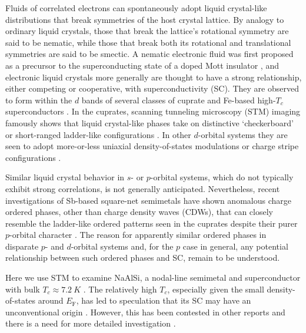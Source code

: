 \documentclass[reprint,superscriptaddress,prb,aps]{revtex4-2}
\begin{document}
\maketitle

Fluids of correlated electrons can spontaneously adopt liquid crystal-like distributions that break symmetries of the host crystal lattice. By analogy to ordinary liquid crystals, those that break the lattice's rotational symmetry are said to be nematic, while those that break both its rotational and translational symmetries are said to be smectic. A nematic electronic fluid was first proposed as a precursor to the superconducting state of a doped Mott insulator \cite{Kivelson1998}, and electronic liquid crystals more generally are thought to have a strong relationship, either competing or cooperative, with superconductivity (SC). They are observed to form within the $d$ bands of several classes of cuprate and Fe-based high-$T_{c}$ superconductors \cite{Tranquada1995,Lawler2010,Keimer2015,Shibauchi2020}. In the cuprates, scanning tunneling microscopy (STM) imaging famously shows that liquid crystal-like phases take on distinctive `checkerboard' or short-ranged ladder-like configurations \cite{Hanaguri2004,Kohsaka2007}. In other $d$-orbital systems they are seen to adopt more-or-less uniaxial density-of-states modulations or charge stripe configurations \cite{Chuang2010,Yim2018,Yuan2021,Butler2022,Li2023,Naritsuka2023,Wang2025}.

Similar liquid crystal behavior in $s$- or $p$-orbital systems, which do not typically exhibit strong correlations, is not generally anticipated. Nevertheless, recent investigations of Sb-based square-net semimetals have shown anomalous charge ordered phases, other than charge density waves (CDWs), that can closely resemble the ladder-like ordered patterns seen in the cuprates despite their purer $p$-orbital character \cite{Venkatesan2025,Que2025}. The reason for apparently similar ordered phases in disparate $p$- and $d$-orbital systems and, for the $p$ case in general, any potential relationship between such ordered phases and SC, remain to be understood.

Here we use STM to examine NaAlSi, a nodal-line semimetal \cite{Muechler2019,Yi2019,Song2022,Uji2023} and superconductor with bulk $T_{c} \approx \SI{7.2}{K}$ \cite{Kuroiwa2007,Rhee2010,Yamada2021,Zhong2024}. The relatively high $T_{c}$, especially given the small density-of-states around $E_{\mathrm{F}}$, has led to speculation that its SC may have an unconventional origin \cite{Yamada2021}. However, this has been contested in other reports and there is a need for more detailed investigation \cite{Kuroiwa2007,Muechler2019}.
\end{document}
